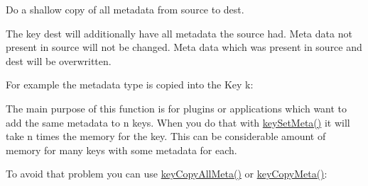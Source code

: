 Do a shallow copy of all metadata from source to dest. 

The key dest will additionally have all metadata the source had. Meta data not present in source will not be changed. Meta data which was present in source and dest will be overwritten.

For example the metadata type is copied into the Key k\+:


\begin{DoxyCodeInclude}{0}
\DoxyCodeLine{\{}
\DoxyCodeLine{        \textcolor{comment}{// receive copy}}
\DoxyCodeLine{        \textcolor{comment}{// the caller will see the changed key k}}
\DoxyCodeLine{        \textcolor{comment}{// with all the metadata from copy}}
\DoxyCodeLine{\}}
\end{DoxyCodeInclude}
 The main purpose of this function is for plugins or applications which want to add the same metadata to n keys. When you do that with \mbox{\hyperlink{group__keymeta_gae1f15546b234ffb6007d8a31178652b9}{key\+Set\+Meta()}} it will take n times the memory for the key. This can be considerable amount of memory for many keys with some metadata for each.

To avoid that problem you can use \mbox{\hyperlink{group__keymeta_ga8e63720a65610a29597494d0671f9401}{key\+Copy\+All\+Meta()}} or \mbox{\hyperlink{group__keymeta_ga9a22b992478e613c8788bd460b4a1f0c}{key\+Copy\+Meta()}}\+:


